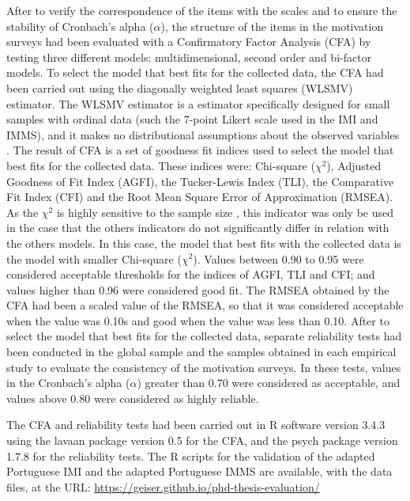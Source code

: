 After to verify the correspondence of the items with the scales and to ensure the stability of Cronbach’s alpha ($\alpha$), the structure of the items in the motivation surveys had been evaluated with a Confirmatory Factor Analysis (CFA) by testing three different models: multidimensional, second order and bi-factor models. To select the model that best fits for the collected data, the CFA had been carried out using the diagonally weighted least squares (WLSMV) estimator. The WLSMV estimator is a estimator specifically designed for small samples with ordinal data (such the 7-point Likert scale used in the IMI and IMMS), and it makes no distributional assumptions about the observed variables \cite{Brown2014,Li2016,RhemtullaBrosseau-LiardSavalei2012}. The result of CFA is a set of goodness fit indices used to select the model that best fits for the collected data. These indices were: Chi-square (${\chi}^2$), Adjusted Goodness of Fit Index (AGFI), the Tucker-Lewis Index (TLI), the Comparative Fit Index (CFI) and the Root Mean Square Error of Approximation (RMSEA). As the ${\chi}^2$ is highly sensitive to the sample size \cite{HuBentler1999}, this indicator was only be used in the case that the others indicators do not significantly differ in relation with the others models. In this case, the model that best fits with the collected data is the model with smaller Chi-square (${\chi}^2$). Values between 0.90 to 0.95 were considered acceptable thresholds for the indices of AGFI, TLI and CFI; and values higher than 0.96 were considered good fit. The RMSEA obtained by the CFA had been a scaled value of the RMSEA, so that it was considered acceptable when the value was 0.10s and good when the value was less than 0.10. After to select the model that best fits for the collected data, separate reliability tests had been conducted in the global sample and the samples obtained in each empirical study to evaluate the consistency of the motivation surveys. In these tests, values in the Cronbach’s alpha ($\alpha$) greater than 0.70 were considered as acceptable, and values above 0.80 were considered as highly reliable.

The CFA and reliability tests had been carried out in R software version 3.4.3 \cite{RCoreTeam2017} using the lavaan package version 0.5 \cite{Rosseel2012} for the CFA, and the psych package version 1.7.8 \cite{Revelle2017} for the reliability tests. The R scripts for the validation of the adapted Portuguese IMI and the adapted Portuguese IMMS are available, with the data files, at the URL: \url{https://geiser.github.io/phd-thesis-evaluation/} 

